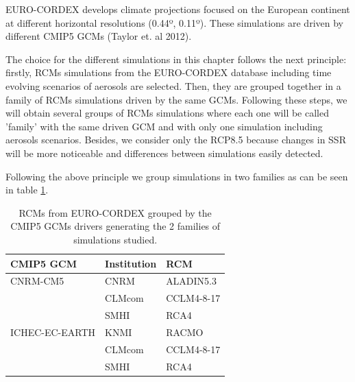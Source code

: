 
EURO-CORDEX develops climate projections focused on the European continent at different horizontal resolutions (0.44º, 0.11º). These simulations are driven by different CMIP5 GCMs (Taylor et. al 2012).

The choice for the different simulations in this chapter follows the next principle: firstly, RCMs simulations from the EURO-CORDEX database including time evolving scenarios of aerosols are selected. Then, they are grouped together in a family of RCMs simulations driven by the same GCMs. Following these steps, we will obtain several groups of RCMs simulations where each one will be called 'family' with the same driven GCM and with only one simulation including aerosols scenarios. Besides, we consider only the RCP8.5 because changes in SSR will be more noticeable and differences between simulations easily detected. 

Following the above principle we group simulations in two families as can be seen in table \ref{tb:families}.

\begin{table}[h]
\caption{\label{tb:families}RCMs from EURO-CORDEX grouped by the CMIP5 GCMs drivers generating the 2 families of simulations studied.}
\footnotesize
\begin{tabular}{>{\raggedrigth}m{3cm}>{\raggedright}m{3cm}>{\raggedright}m{3cm}}
\toprule 
CMIP5 GCM & Institution  & RCM  \tabularnewline
\midrule
 CNRM-CM5 & CNRM & ALADIN5.3 \tabularnewline
&CLMcom&CCLM4-8-17\tabularnewline 
&SMHI&RCA4\tabularnewline
\midrule  
ICHEC-EC-EARTH&KNMI&RACMO\tabularnewline
&CLMcom&CCLM4-8-17\tabularnewline
&SMHI&RCA4\tabularnewline
\bottomrule
\end{tabular}\\
\end{table}
\normalsize

